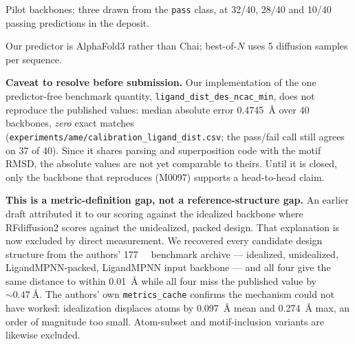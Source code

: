 \begin{planlist}
  \item Pilot backbones: three drawn from the \texttt{pass} class, at
        32/40, 28/40 and 10/40 passing predictions in the deposit.
  \item Our predictor is AlphaFold3 rather than Chai; best-of-$N$ uses 5
        diffusion samples per sequence.
  \item \textbf{Caveat to resolve before submission.} Our implementation of the
        one predictor-free benchmark quantity, \texttt{ligand\_dist\_des\_ncac\_min},
        does not reproduce the published values: median absolute error
        \SI{0.4745}{\angstrom} over 40 backbones, \emph{zero} exact matches
        (\texttt{experiments/ame/calibration\_ligand\_dist.csv}; the pass/fail
        call still agrees on 37 of 40). Since
        it shares parsing and superposition code with the motif RMSD, the
        absolute values are not yet comparable to theirs. Until it is closed,
        only the backbone that reproduces (M0097) supports a head-to-head claim.
  \item \textbf{This is a metric-definition gap, not a reference-structure
        gap.} An earlier draft attributed it to our scoring against the
        idealized backbone where RFdiffusion2 scores against the unidealized,
        packed design. That explanation is now excluded by direct measurement.
        We recovered every candidate design structure from the authors'
        \SI{177}{\giga\byte} benchmark archive --- idealized, unidealized,
        LigandMPNN-packed, LigandMPNN input backbone --- and all four give the
        same distance to within \SI{0.01}{\angstrom} while all four miss the
        published value by ${\sim}\SI{0.47}{\angstrom}$. The authors' own
        \texttt{metrics\_cache} confirms the mechanism could not have worked:
        idealization displaces atoms by \SI{0.097}{\angstrom} mean and
        \SI{0.274}{\angstrom} max, an order of magnitude too small. Atom-subset
        and motif-inclusion variants are likewise excluded.
\end{planlist}


